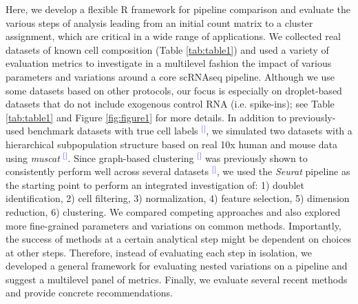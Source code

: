 \documentclass[11pt]{article}
\renewcommand{\cite}[1]{\textcolor{Blue}{$^[$\supercite{#1}$^]$}}
\begin{document}
Here, we develop a flexible R framework for pipeline comparison and evaluate the various steps of analysis leading from an initial count matrix to a cluster assignment, which are critical in a wide range of applications. We collected real datasets of known cell composition (Table \ref{tab:table1}) and used a variety of evaluation metrics to investigate in a multilevel fashion the impact of various parameters and variations around a core scRNAseq pipeline. Although we use some datasets based on other protocols, our focus is especially on droplet-based datasets that do not include exogenous control RNA (i.e. spike-ins); see Table \ref{tab:table1} and Figure \ref{fig:figure1} for more details. In addition to previously-used benchmark datasets with true cell labels \cite{duoClustering2018,tianMixology2018}, we simulated two datasets with a hierarchical subpopulation structure based on real 10x human and mouse data using \textit{muscat} \cite{CrowellMuscat2019}. 
Since graph-based clustering \cite{satijaSeurat2015} was previously shown to consistently perform well across several datasets \cite{duoClustering2018,tianMixology2018}, we used the \textit{Seurat} pipeline as the starting point to perform an integrated investigation of: 1) doublet identification, 2) cell filtering, 3) normalization, 4) feature selection, 5) dimension reduction, 6) clustering. We compared competing approaches and also explored more fine-grained parameters and variations on common methods. Importantly, the success of methods at a certain analytical step might be dependent on choices at other steps. Therefore, instead of evaluating each step in isolation, we developed a general framework for evaluating nested variations on a pipeline and suggest a multilevel panel of metrics. Finally, we evaluate several recent methods and provide concrete recommendations.
\end{document}
